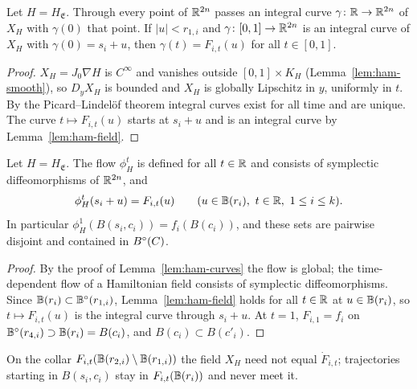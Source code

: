 \begin{lemma}\label{lem:ham-curves}
Let $H=H_{\mathfrak E}$. Through every point of $\mathbb{R}^{2n}$ passes an integral curve $\gamma\colon\mathbb{R}\to\mathbb{R}^{2n}$ of $X_H$ with
$\gamma(0)$ that point. If $|u|<r_{1,i}$ and $\gamma\colon[0,1]\to\mathbb{R}^{2n}$ is an integral curve of $X_H$ with
$\gamma(0)=s_i+u$, then $\gamma(t)=F_{i,t}(u)$ for all $t\in[0,1]$.
\end{lemma}

\begin{proof}
$X_H=J_0\nabla H$ is $C^\infty$ and vanishes outside $[0,1]\times K_H$ (Lemma~\ref{lem:ham-smooth}), so $D_yX_H$ is bounded and
$X_H$ is globally Lipschitz in $y$, uniformly in $t$. By the Picard--Lindel\"of theorem integral curves exist for all
time and are unique. The curve $t\mapsto F_{i,t}(u)$ starts at $s_i+u$ and is an integral curve by Lemma~\ref{lem:ham-field}.
\end{proof}

\begin{theorem}\label{thm:ham-flow}
Let $H=H_{\mathfrak E}$. The flow $\phi^t_H$ is defined for all $t\in\mathbb{R}$ and consists of symplectic diffeomorphisms of
$\mathbb{R}^{2n}$, and
\[
 \phi^t_H(s_i+u)=F_{i,t}(u)\qquad(u\in\EB(r_i),\ t\in\R,\ 1\le i\le k).
\]
In particular $\phi^1_H(B(s_i,c_i))=f_i(B(c_i))$, and these sets are pairwise disjoint and contained in $B^{\circ}(C)$.
\end{theorem}

\begin{proof}
By the proof of Lemma~\ref{lem:ham-curves} the flow is global; the time-dependent flow of a Hamiltonian field consists of
symplectic diffeomorphisms. Since $\mathbb{B}(r_i)\subset\mathbb{B}^\circ(r_{1,i})$, Lemma~\ref{lem:ham-field} holds for all $t\in\mathbb{R}$ at
$u\in\mathbb{B}(r_i)$, so $t\mapsto F_{i,t}(u)$ is the integral curve through $s_i+u$. At $t=1$, $F_{i,1}=f_i$ on
$\mathbb{B}^\circ(r_{4,i})\supset\mathbb{B}(r_i)=B(c_i)$, and $B(c_i)\subset B(c'_i)$.
\end{proof}

On the collar $F_{i,t}(\mathbb{B}(r_{2,i})\setminus\mathbb{B}(r_{1,i}))$ the field $X_H$ need not equal $\dot F_{i,t}$; trajectories
starting in $B(s_i,c_i)$ stay in $F_{i,t}(\mathbb{B}(r_i))$ and never meet it.

